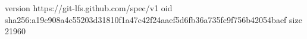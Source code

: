 version https://git-lfs.github.com/spec/v1
oid sha256:a19c908a4c55203d31810f1a47c42f24aaef5d6fb36a735fc9f756b42054baef
size 21960
